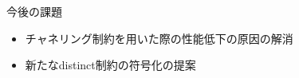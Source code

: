 \documentclass [dvipdfmx,11pt]{beamer}
\begin{document}
\begin{frame}
  \begin{alertblock}{今後の課題}
    \begin{itemize}
    \item チャネリング制約を用いた際の性能低下の原因の解消
    \item 新たなdistinct制約の符号化の提案\\
    \end{itemize}
  \end{alertblock}

\end{frame}



\end{document}
